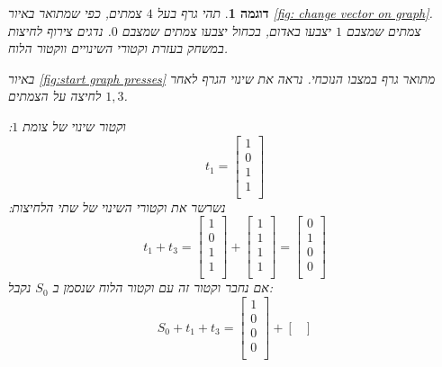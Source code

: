 \documentclass[12pt,leqno]{article}
\theoremstyle{theoremdd}
\newtheorem{example}{דוגמה}[section]
\begin{document}
\begin{example}
    תהי גרף בעל 
    $4$
    צמתים,
    כפי שמתואר באיור
    \ref{fig: change vector on graph}.
    צמתים שמצבם 
    $1$
    יצבעו באדום,
    בכחול 
    יצבעו צמתים שמצבם 
    $0$.
    נדגים צירוף לחיצות במשחק 
    בעזרת וקטורי השינויים ווקטור הלוח.


    באיור
    \ref{fig:start graph presses}
    מתואר גרף במצבו הנוכחי.
    נראה את שינוי הגרף לאחר לחיצה על הצמתים 
    $1, 3$.
 
    וקטור שינוי של צומת 
    $1$:
    \[
        t_1 = 
        \begin{bmatrix}
            1 \\
            0 \\
            1 \\
            1 \\
        \end{bmatrix}
    \]
    נשרשר את וקטורי השינוי של שתי הלחיצות:
    \[
        t_1 + t_3 = 
        \begin{bmatrix}
            1 \\
            0 \\
            1 \\
            1 \\
        \end{bmatrix}
        +
        \begin{bmatrix}
            1 \\
            1 \\
            1 \\
            1 \\
        \end{bmatrix}
        =
        \begin{bmatrix}
            0 \\
            1 \\
            0 \\
            0 \\
        \end{bmatrix}
    \]
    אם נחבר וקטור זה עם וקטור הלוח שנסמן ב
    $S_0$
    נקבל:
    \[
        S_0 + t_1 + t_3 = 
        \begin{bmatrix}
            1 \\
            0 \\
            0 \\
            0 \\
        \end{bmatrix}
        +
        \begin{bmatrix}

\end{bmatrix}\]
\end{example}
\end{document}
